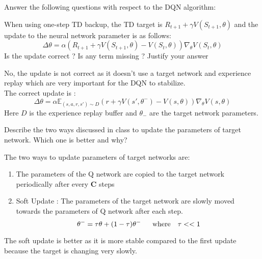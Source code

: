 \documentclass[solution,addpoints,12pt]{exam}
\begin{document}
\begin{questions}
\question[4] Answer the following questions with respect to the DQN algorithm:
\begin{itemize}
    \question [2] When using one-step TD backup, the TD target is $R_{t+1}+\gamma V(S_{t+1},\theta)$ and the update to the neural network parameter is as follows:\\
    \begin{equation}
        \Delta \theta=\alpha(R_{t+1}+\gamma V(S_{t+1},\theta)-V(S_{t},\theta))\nabla_{\theta}V(S_{t},\theta)
    \end{equation}
    Is the update correct ? Is any term missing ? Justify your answer
    \begin{solution}
    No, the update is not correct as it doesn't use a target network and experience replay which are very important for the DQN to stabilize. \\
    The correct update is :
    \begin{equation}
        \Delta \theta=\alpha \mathbb{E}_{(s,a,r,s')\sim D}(r+\gamma V(s',\theta^{-})-V(s,\theta))\nabla_{\theta}V(s,\theta)
    \end{equation}
    Here $D$ is the experience replay buffer and $\theta_{-}$ are the target network parameters.    
    \end{solution}
    \question [2] Describe the two ways discussed in class to update the parameters of target network. Which one is better and why?
    \begin{solution}
    The two ways to update parameters of target networks are:
    \begin{enumerate}
     \item The parameters of the Q network are copied to the target network periodically after every \textbf{C} steps 
     \item Soft Update : The parameters of the target network are slowly moved towards the parameters of Q network after each step. \\
     \begin{equation}
      \theta^{-} = \tau \theta + (1 - \tau) \theta^{-}  \hspace{16px} \text{where} \hspace{10px} \tau << 1 
     \end{equation}
    \end{enumerate}

    The soft update is better as it is more stable compared to the first update because the target is changing very slowly.
    
    \end{solution}
\end{itemize}


\end{questions}
\end{document}

